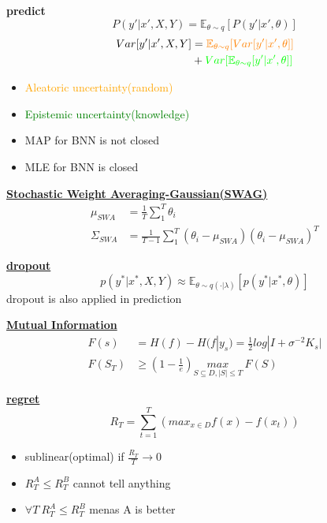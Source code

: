 \documentclass[landscape,a0paper,fontscale=0.285]{baposter} %
\newcommand{\compresslist}{ %
\setlength{\itemsep}{1pt}
\setlength{\parskip}{0pt}
\setlength{\parsep}{0pt}
}
\begin{document}
\begin{poster}
{\textbf{predict}
\vspace{-0.5cm}
$$
P(y'|x',X,Y) = \mathbb E_{\theta\sim q}[P(y'|x',\theta)]
$$
$$
\begin{aligned}
Var[y'|x',X,Y] &= {\color{orange}\mathbb E_{\theta\sim q}[Var[y'|x',\theta]]}\\
&+{\color{green}Var[\mathbb E_{\theta\sim q}[y'|x',\theta]]}
\end{aligned}
$$
\begin{itemize}\compresslist
    \item \textcolor{orange}{Aleatoric uncertainty(random)} 
    \item \textcolor{green}{Epistemic uncertainty(knowledge)}
\end{itemize}
\begin{itemize}\compresslist
    \item MAP for BNN is  not closed
    \item MLE for BNN is closed
\end{itemize}
\underline{\textbf{Stochastic Weight Averaging-Gaussian(SWAG)}}
\vspace{-0.2cm}
$$
\begin{aligned}
\mu_{SWA} &= \frac{1}{T}\sum_1^T \theta_i\\
\Sigma_{SWA} &= \frac{1}{T-1}\sum_1^T(\theta_i - \mu_{SWA})(\theta_i-\mu_{SWA})^T
\end{aligned}
$$

\underline{\textbf{dropout}}
$$ 
p(y^*|x^*,X,Y) \approx \mathbb E_{\theta\sim q(\cdot|\lambda)}[p(y^*|x^*,\theta)]
$$
dropout is also applied in prediction



\colorbox[HTML]{CCFFFF}{}
\underline{\textbf{Mutual Information}}
\vspace{-0.3cm}
$$
\begin{aligned}
F(s) &= H(f) - H(f|y_s) = \frac{1}{2}log|I+\sigma^{-2}K_s|
\\
F(S_T) &\ge (1-\frac{1}{e})\underset{S\subseteq D,|S|\le T}{max}~F(S)
\end{aligned}
$$

\underline{\textbf{regret}}
\vspace{-0.7cm}
$$
R_T = \sum_{t=1}^T (max_{x\in D}f(x)-f(x_t))
$$
\begin{itemize}\compresslist
    \item sublinear(optimal) if $\frac{R_T}{T} \rightarrow 0$
    \item $R_T^A \le R_T^B$ cannot tell anything
    \item $\forall T~R_T^A \le R_T^B$ menas A is better
\end{itemize}


}
\end{poster}
\end{document}
